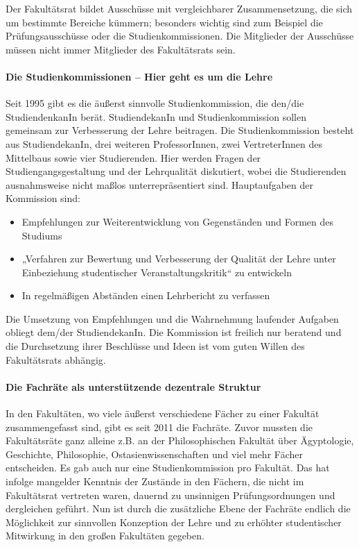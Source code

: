 Der Fakultätsrat bildet Ausschüsse mit vergleichbarer Zusammensetzung, die sich um bestimmte Bereiche kümmern; besonders wichtig
sind zum Beispiel die Prüfungsausschüsse oder die Studienkommissionen. Die Mitglieder der Ausschüsse müssen nicht immer Mitglieder des Fakultätsrats
sein.


\paragraph{Die Studienkommissionen -- Hier geht es um die Lehre}

Seit 1995 gibt es die äußerst sinnvolle Studienkommission, die den/die StudiendenkanIn berät. StudiendekanIn und Studienkommission sollen gemeinsam zur Verbesserung der Lehre beitragen. Die Studienkommission besteht aus StudiendekanIn, drei weiteren ProfessorInnen, zwei VertreterInnen des Mittelbaus sowie vier Studierenden. Hier werden Fragen der Studiengangsgestaltung und der Lehrqualität diskutiert, wobei die Studierenden ausnahmsweise nicht maßlos unterrepräsentiert sind. Hauptaufgaben der Kommission sind:
\begin{itemize}
    \addtolength{\itemsep}{-0.7\baselineskip}
    \item Empfehlungen zur Weiterentwicklung von Gegenständen und Formen des Studiums
    \item „Verfahren zur Bewertung und Verbesserung der Qualität der Lehre unter
          Einbeziehung studentischer Veranstaltungskritik“ zu entwickeln
    \item In regelmäßigen Abständen einen Lehrbericht zu verfassen
\end{itemize}

Die Umsetzung von Empfehlungen und die Wahrnehmung laufender Aufgaben obliegt dem/der StudiendekanIn. Die Kommission ist freilich nur
beratend und die Durchsetzung ihrer Beschlüsse und Ideen ist vom guten Willen des Fakultätsrats abhängig.

\paragraph{Die Fachräte als unterstützende dezentrale Struktur}

In den Fakultäten, wo viele äußerst verschiedene Fächer zu einer Fakultät zusammengefasst sind, gibt es seit 2011 die Fachräte. Zuvor mussten die Fakultätsräte ganz alleine z.B. an der Philosophischen Fakultät über Ägyptologie, Geschichte, Philosophie, Ostasienwissenschaften und viel mehr Fächer entscheiden. Es gab auch nur eine Studienkommission pro Fakultät. Das hat infolge mangelder Kenntnis der Zustände in den Fächern, die nicht im Fakultätsrat vertreten waren, dauernd zu unsinnigen Prüfungsordnungen und dergleichen geführt. Nun ist durch die zusätzliche Ebene der Fachräte endlich die Möglichkeit zur sinnvollen Konzeption der Lehre und zu erhöhter studentischer Mitwirkung in den großen Fakultäten gegeben.

